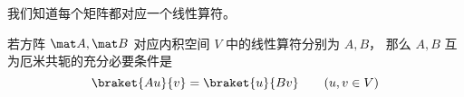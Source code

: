 
\begin{issues}
\issueDraft
\end{issues}


我们知道每个矩阵都对应一个线性算符。

\begin{theorem}{}
若方阵 $\mat A, \mat B$ 对应内积空间 $V$ 中的线性算符分别为 $A, B$， 那么 $A, B$ 互为厄米共轭的充分必要条件是
\begin{equation}
\braket{Au}{v} = \braket{u}{B v} \qquad (u, v \in V)
\end{equation}
\end{theorem}

